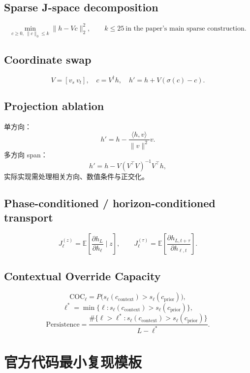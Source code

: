 \documentclass[10.5pt,a4paper]{ctexart}
\begin{document}
\subsection{Sparse J-space decomposition}
\[
\min_{c\ge0,\ \|c\|_0\le k}
\|h-Vc\|_2^2,
\qquad k\le25\ \text{in the paper's main sparse construction}.
\]

\subsection{Coordinate swap}
\[
V=[v_s\ v_t],\quad c=V^\dagger h,
\quad
h'=h+V(\sigma(c)-c).
\]

\subsection{Projection ablation}
单方向：
\[
h'=h-\frac{\langle h,v\rangle}{\|v\|^2}v.
\]
多方向 span：
\[
h'=h-V(V^\top V)^{-1}V^\top h,
\]
实际实现需处理相关方向、数值条件与正交化。

\subsection{Phase-conditioned / horizon-conditioned transport}
\[
J_\ell^{(z)}
=
\mathbb E
\left[
\frac{\partial h_L}{\partial h_\ell}
\mid z
\right],
\qquad
J_\ell^{(\tau)}
=
\mathbb E
\left[
\frac{\partial h_{L,t+\tau}}{\partial h_{\ell,t}}
\right].
\]

\subsection{Contextual Override Capacity}
\[
\mathrm{COC}_\ell
=P\bigl(s_\ell(c_{\mathrm{context}})>s_\ell(c_{\mathrm{prior}})\bigr),
\]
\[
\ell^*
=\min\{\ell:s_\ell(c_{\mathrm{context}})>s_\ell(c_{\mathrm{prior}})\},
\]
\[
\mathrm{Persistence}
=
\frac{\#\{\ell>\ell^*:s_\ell(c_{\mathrm{context}})>s_\ell(c_{\mathrm{prior}})\}}{L-\ell^*}.
\]

\section{官方代码最小复现模板}
\end{document}
